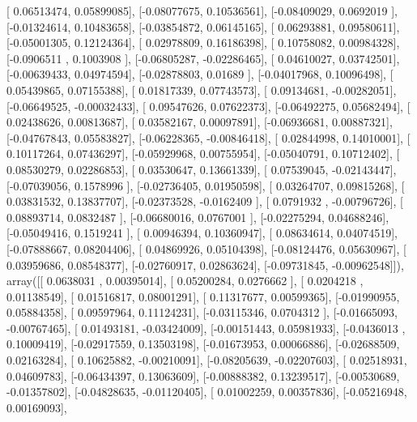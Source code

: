\documentclass{article}
\begin{document}
       [ 0.06513474,  0.05899085],
       [-0.08077675,  0.10536561],
       [-0.08409029,  0.0692019 ],
       [-0.01324614,  0.10483658],
       [-0.03854872,  0.06145165],
       [ 0.06293881,  0.09580611],
       [-0.05001305,  0.12124364],
       [ 0.02978809,  0.16186398],
       [ 0.10758082,  0.00984328],
       [-0.0906511 ,  0.1003908 ],
       [-0.06805287, -0.02286465],
       [ 0.04610027,  0.03742501],
       [-0.00639433,  0.04974594],
       [-0.02878803,  0.01689   ],
       [-0.04017968,  0.10096498],
       [ 0.05439865,  0.07155388],
       [ 0.01817339,  0.07743573],
       [ 0.09134681, -0.00282051],
       [-0.06649525, -0.00032433],
       [ 0.09547626,  0.07622373],
       [-0.06492275,  0.05682494],
       [ 0.02438626,  0.00813687],
       [ 0.03582167,  0.00097891],
       [-0.06936681,  0.00887321],
       [-0.04767843,  0.05583827],
       [-0.06228365, -0.00846418],
       [ 0.02844998,  0.14010001],
       [ 0.10117264,  0.07436297],
       [-0.05929968,  0.00755954],
       [-0.05040791,  0.10712402],
       [ 0.08530279,  0.02286853],
       [ 0.03530647,  0.13661339],
       [ 0.07539045, -0.02143447],
       [-0.07039056,  0.1578996 ],
       [-0.02736405,  0.01950598],
       [ 0.03264707,  0.09815268],
       [ 0.03831532,  0.13837707],
       [-0.02373528, -0.0162409 ],
       [ 0.0791932 , -0.00796726],
       [ 0.08893714,  0.0832487 ],
       [-0.06680016,  0.0767001 ],
       [-0.02275294,  0.04688246],
       [-0.05049416,  0.1519241 ],
       [ 0.00946394,  0.10360947],
       [ 0.08634614,  0.04074519],
       [-0.07888667,  0.08204406],
       [ 0.04869926,  0.05104398],
       [-0.08124476,  0.05630967],
       [ 0.03959686,  0.08548377],
       [-0.02760917,  0.02863624],
       [-0.09731845, -0.00962548]]), array([[ 0.0638031 ,  0.00395014],
       [ 0.05200284,  0.0276662 ],
       [ 0.0204218 ,  0.01138549],
       [ 0.01516817,  0.08001291],
       [ 0.11317677,  0.00599365],
       [-0.01990955,  0.05884358],
       [ 0.09597964,  0.11124231],
       [-0.03115346,  0.0704312 ],
       [-0.01665093, -0.00767465],
       [ 0.01493181, -0.03424009],
       [-0.00151443,  0.05981933],
       [-0.0436013 ,  0.10009419],
       [-0.02917559,  0.13503198],
       [-0.01673953,  0.00066886],
       [-0.02688509,  0.02163284],
       [ 0.10625882, -0.00210091],
       [-0.08205639, -0.02207603],
       [ 0.02518931,  0.04609783],
       [-0.06434397,  0.13063609],
       [-0.00888382,  0.13239517],
       [-0.00530689, -0.01357802],
       [-0.04828635, -0.01120405],
       [ 0.01002259,  0.00357836],
       [-0.05216948,  0.00169093],
\end{document}
